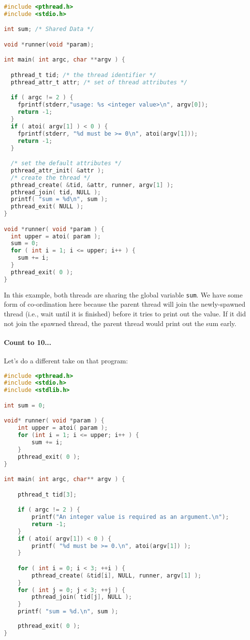 \begin{lstlisting}[language=C]
#include <pthread.h>
#include <stdio.h>

int sum; /* Shared Data */

void *runner(void *param);

int main( int argc, char **argv ) {

  pthread_t tid; /* the thread identifier */
  pthread_attr_t attr; /* set of thread attributes */

  if ( argc != 2 ) {
    fprintf(stderr,"usage: %s <integer value>\n", argv[0]); 
    return -1;
  }
  if ( atoi( argv[1] ) < 0 ) {
    fprintf(stderr, "%d must be >= 0\n", atoi(argv[1])); 
    return -1;
  }

  /* set the default attributes */
  pthread_attr_init( &attr );
  /* create the thread */
  pthread_create( &tid, &attr, runner, argv[1] );
  pthread_join( tid, NULL ); 
  printf( "sum = %d\n", sum );
  pthread_exit( NULL );
}

void *runner( void *param ) {
  int upper = atoi( param );
  sum = 0;
  for ( int i = 1; i <= upper; i++ ) {
    sum += i;
  }
  pthread_exit( 0 );
}
\end{lstlisting}

In this example, both threads are sharing the global variable \texttt{sum}. We have some form of co-ordination here because the parent thread will join the newly-spawned thread (i.e., wait until it is finished) before it tries to print out the value. If it did not join the spawned thread, the parent thread would print out the sum early. 



\paragraph{Count to 10...}

Let's do a different take on that program:

\begin{lstlisting}[language=C]
#include <pthread.h>
#include <stdio.h>
#include <stdlib.h>

int sum = 0;

void* runner( void *param ) {
    int upper = atoi( param );
    for (int i = 1; i <= upper; i++ ) {
        sum += i;
    }
    pthread_exit( 0 );
}

int main( int argc, char** argv ) { 

    pthread_t tid[3];

    if ( argc != 2 ) {
        printf("An integer value is required as an argument.\n");
        return -1; 
    }   
    if ( atoi( argv[1]) < 0 ) {
        printf( "%d must be >= 0.\n", atoi(argv[1]) );
    }   

    for ( int i = 0; i < 3; ++i ) { 
        pthread_create( &tid[i], NULL, runner, argv[1] );
    }   
    for ( int j = 0; j < 3; ++j ) { 
        pthread_join( tid[j], NULL );
    }   
    printf( "sum = %d.\n", sum );
    
    pthread_exit( 0 );
}
\end{lstlisting}

